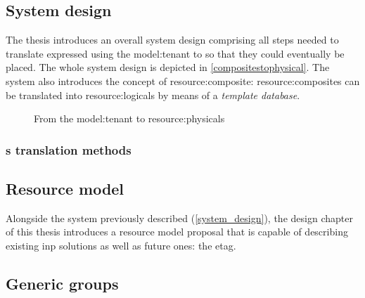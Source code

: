 \subsection{System design} \label{system_design}
The thesis introduces an overall system design comprising all steps needed to translate  expressed using the \gls{model:tenant} to  so that they could eventually be placed.
The whole system design is depicted in \autoref{compositestophysical}.
The system also introduces the concept of \gls{resource:composite}:
\Glspl{resource:composite} can be translated into \glspl{resource:logical} by means of a \textit{template database}.

\newsavebox\compositestophysical \savebox{}
\begin{figure}[!htb]
    \centering
    \usebox{\compositestophysical}
    \caption{From the \gls{model:tenant} to \glspl{resource:physical}}
    \label{compositestophysical}
\end{figure}

\subsubsection{\texorpdfstring{}{Composite}s translation methods}


\subsection{Resource model}
Alongside the system previously described (\autoref{system_design}), the design chapter of this thesis introduces a resource model proposal that is capable of describing existing \gls{inp} solutions as well as future ones: the \gls{etag}.
\newsavebox\tagmodfigure \savebox{}


\subsection{Generic groups}


